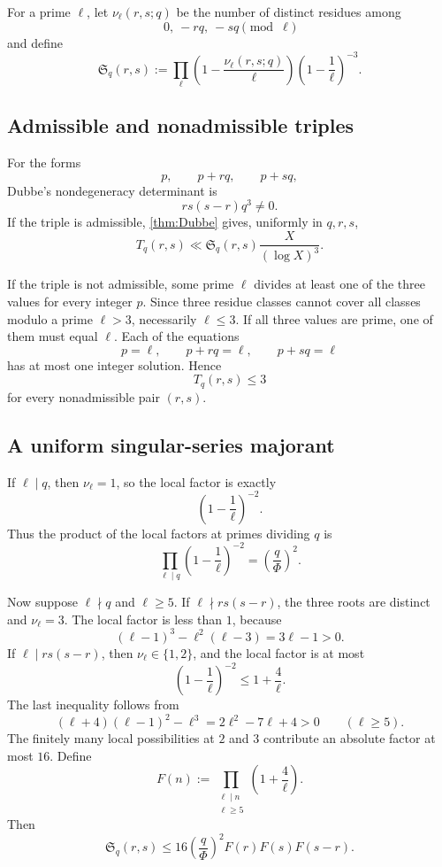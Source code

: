\documentclass[11pt]{article}
\theoremstyle{definition}
\theoremstyle{remark}
\newcommand{\Ss}{\mathfrak S}
\newcommand{\1}{\mathbf 1}
\begin{document}
For a prime $\ell$, let $\nu_\ell(r,s;q)$ be the number of distinct residues among
\[
 0,\ -rq,\ -sq\pmod\ell
\]
and define
\begin{equation}\label{eq:series}
 \Ss_q(r,s):=
 \prod_\ell
 \left(1-\frac{\nu_\ell(r,s;q)}{\ell}\right)
 \left(1-\frac1\ell\right)^{-3}.
\end{equation}

\subsection{Admissible and nonadmissible triples}

For the forms
\[
 p,\qquad p+rq,\qquad p+sq,
\]
Dubbe's nondegeneracy determinant is
\[
 rs(s-r)q^3\ne0.
\]
If the triple is admissible, \cref{thm:Dubbe} gives, uniformly in $q,r,s$,
\begin{equation}\label{eq:triple-sieve}
 T_q(r,s)\ll \Ss_q(r,s)\frac{X}{(\log X)^3}.
\end{equation}

If the triple is not admissible, some prime $\ell$ divides at least one of the three values for every integer $p$.  Since three residue classes cannot cover all classes modulo a prime $\ell>3$, necessarily $\ell\le3$.  If all three values are prime, one of them must equal $\ell$.  Each of the equations
\[
 p=\ell,\qquad p+rq=\ell,\qquad p+sq=\ell
\]
has at most one integer solution.  Hence
\begin{equation}\label{eq:nonadm}
 T_q(r,s)\le3
\end{equation}
for every nonadmissible pair $(r,s)$.

\subsection{A uniform singular-series majorant}

If $\ell\mid q$, then $\nu_\ell=1$, so the local factor is exactly
\[
 \left(1-\frac1\ell\right)^{-2}.
\]
Thus the product of the local factors at primes dividing $q$ is
\begin{equation}\label{eq:qfactor}
 \prod_{\ell\mid q}\left(1-\frac1\ell\right)^{-2}
 =\left(\frac q\Phi\right)^2.
\end{equation}

Now suppose $\ell\nmid q$ and $\ell\ge5$.
If $\ell\nmid rs(s-r)$, the three roots are distinct and $\nu_\ell=3$.  The local factor is less than $1$, because
\[
 (\ell-1)^3-\ell^2(\ell-3)=3\ell-1>0.
\]
If $\ell\mid rs(s-r)$, then $\nu_\ell\in\{1,2\}$, and the local factor is at most
\[
 \left(1-\frac1\ell\right)^{-2}\le1+\frac4\ell.
\]
The last inequality follows from
\[
 (\ell+4)(\ell-1)^2-\ell^3=2\ell^2-7\ell+4>0
 \qquad(\ell\ge5).
\]
The finitely many local possibilities at $2$ and $3$ contribute an absolute factor at most $16$.
Define
\[
 F(n):=\prod_{\substack{\ell\mid n\\\ell\ge5}}
 \left(1+\frac4\ell\right).
\]
Then
\begin{equation}\label{eq:series-majorant}
 \boxed{
 \Ss_q(r,s)\le16\left(\frac q\Phi\right)^2
 F(r)F(s)F(s-r).}
\end{equation}
\end{document}
